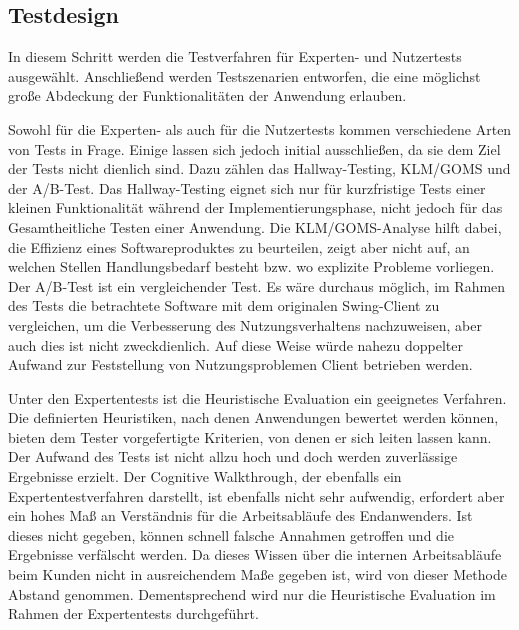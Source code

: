 \subsection{Testdesign}
In diesem Schritt werden die Testverfahren für Experten- und Nutzertests ausgewählt. Anschließend werden Testszenarien entworfen, die eine möglichst große Abdeckung der Funktionalitäten der Anwendung erlauben.\par
{}
Sowohl für die Experten- als auch für die Nutzertests kommen verschiedene Arten von Tests in Frage. Einige lassen sich jedoch initial ausschließen, da sie dem Ziel der Tests nicht dienlich sind. Dazu zählen das Hallway-Testing, KLM/GOMS und der A/B-Test. Das Hallway-Testing eignet sich nur für kurzfristige Tests einer kleinen Funktionalität während der Implementierungsphase, nicht jedoch für das Gesamtheitliche Testen einer Anwendung. Die KLM/GOMS-Analyse hilft dabei, die Effizienz eines Softwareproduktes zu beurteilen, zeigt aber nicht auf, an welchen Stellen Handlungsbedarf besteht bzw. wo explizite Probleme vorliegen. Der A/B-Test ist ein vergleichender Test. Es wäre durchaus möglich, im Rahmen des Tests die betrachtete Software mit dem originalen Swing-Client zu vergleichen, um die Verbesserung des Nutzungsverhaltens nachzuweisen, aber auch dies ist nicht zweckdienlich. Auf diese Weise würde nahezu doppelter Aufwand zur Feststellung von Nutzungsproblemen Client betrieben werden.\par
Unter den Expertentests ist die Heuristische Evaluation ein geeignetes Verfahren. Die definierten Heuristiken, nach denen Anwendungen bewertet werden können, bieten dem Tester vorgefertigte Kriterien, von denen er sich leiten lassen kann. Der Aufwand des Tests ist nicht allzu hoch und doch werden zuverlässige Ergebnisse erzielt. Der Cognitive Walkthrough, der ebenfalls ein Expertentestverfahren darstellt, ist ebenfalls nicht sehr aufwendig, erfordert aber ein hohes Maß an Verständnis für die Arbeitsabläufe des Endanwenders. Ist dieses nicht gegeben, können schnell falsche Annahmen getroffen und die Ergebnisse verfälscht werden. Da dieses Wissen über die internen Arbeitsabläufe beim Kunden nicht in ausreichendem Maße gegeben ist, wird von dieser Methode Abstand genommen. Dementsprechend wird nur die Heuristische Evaluation im Rahmen der Expertentests durchgeführt.\par
